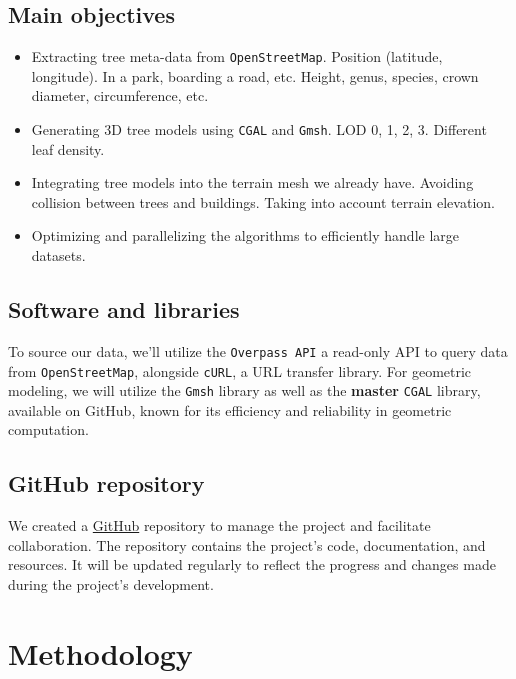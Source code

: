 \documentclass[12pt]{article}
\begin{document}
\subsection{Main objectives}

\begin{itemize}
    \item Extracting tree meta-data from \texttt{OpenStreetMap}.
    \subitem Position (latitude, longitude). In a park, boarding a road, etc.
    \subitem Height, genus, species, crown diameter, circumference, etc.
    \item Generating 3D tree models using \texttt{CGAL}\cite{cgal} and \texttt{Gmsh}\cite{gmsh}.
    \subitem LOD 0, 1, 2, 3.
    \subitem Different leaf density.
    \item Integrating tree models into the terrain mesh we already have.
    \subitem Avoiding collision between trees and buildings.
    \subitem Taking into account terrain elevation.
    \item Optimizing and parallelizing the algorithms to efficiently handle large datasets.
\end{itemize}

\subsection{Software and libraries}
To source our data, we'll utilize the \texttt{Overpass API}\cite{overpass} a
read-only API to query data from \texttt{OpenStreetMap}, alongside
\texttt{cURL}\cite{curl}, a URL transfer library. For geometric modeling, we
will utilize the \texttt{Gmsh}\cite{gmsh} library as well as the \textbf{master}
 \texttt{CGAL} library, available on
GitHub\cite{cgal-master}, known for its efficiency and reliability in geometric
computation.

\subsection{GitHub repository}
We created a \href{https://github.com/feelpp/ktirio-geom}{GitHub}
repository to manage the project and facilitate collaboration.
The repository contains the project's code, documentation, and resources.
It will be updated regularly to reflect the progress and changes made during
the project's development.




\section{Methodology}
\end{document}
